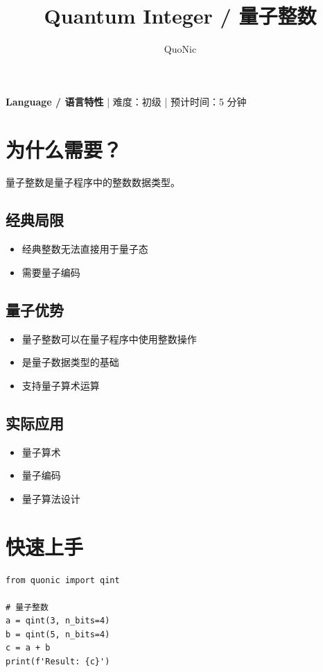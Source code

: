 \documentclass[12pt,a4paper]{article}
\title{Quantum Integer / 量子整数}
\author{QuoNic}
\date{}
\begin{document}
\maketitle

\begin{center}
\textbf{Language / 语言特性} | 难度：初级 | 预计时间：5 分钟
\end{center}

\tableofcontents
\newpage

\section{为什么需要？}

量子整数是量子程序中的整数数据类型。

\subsection{经典局限}
\begin{itemize}
  \item 经典整数无法直接用于量子态
  \item 需要量子编码
\end{itemize}

\subsection{量子优势}
\begin{itemize}
  \item 量子整数可以在量子程序中使用整数操作
  \item 是量子数据类型的基础
  \item 支持量子算术运算
\end{itemize}

\subsection{实际应用}
\begin{itemize}
  \item 量子算术
  \item 量子编码
  \item 量子算法设计
\end{itemize}

\section{快速上手}

\begin{verbatim}
from quonic import qint

# 量子整数
a = qint(3, n_bits=4)
b = qint(5, n_bits=4)
c = a + b
print(f'Result: {c}')
\end{verbatim}
\end{document}
